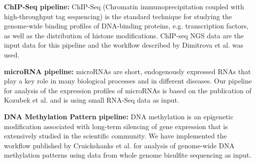 \textbf{ChIP-Seq pipeline:} ChIP-Seq (Chromatin immunoprecipitation coupled with high-throughput tag sequencing) is the standard technique for studying the genome-wide binding profiles of DNA-binding proteins, e.g. transcription factors, as well as the distribution of histone modifications. ChIP-seq NGS data are the input data for this pipeline and the workflow described by Dimitrova et al. \cite{dimitrova2014pax5} was used.

\textbf{microRNA pipeline:} microRNAs are short, endogenously expressed RNAs that play a key role in many biological processes and in different diseases. Our pipeline for analysis of the expression profiles of microRNAs is based on the publication of Kozubek et al. \cite{kozubek2013depth} and is using small RNA-Seq data as input.

\textbf{DNA Methylation Pattern pipeline:} DNA methylation is an epigenetic modification associated with long-term silencing of gene expression that is extensively studied in the scientific community. We have implemented the workflow published by Cruickshanks et al. \cite{cruickshanks2013senescent} for analysis of genome-wide DNA methylation patterns using data from whole genome bisulfite sequencing as input.



